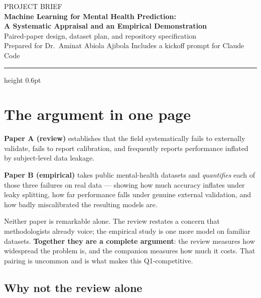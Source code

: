 \documentclass[11pt,a4paper]{article}
\begin{document}
\begin{center}
  {\sffamily\footnotesize\color{softgrey}\MakeUppercase{Project brief}}\\[0.9em]
  {\sffamily\LARGE\bfseries Machine Learning for Mental Health Prediction:\\[0.3em]
   A Systematic Appraisal and an Empirical Demonstration}\\[0.7em]
  {\sffamily\normalsize\color{softgrey} Paired-paper design, dataset plan, and
   repository specification}\\[0.9em]
  {\footnotesize\color{softgrey} Prepared for Dr.\ Aminat Abiola Ajibola \quad\textbullet\quad
   Includes a kickoff prompt for Claude Code}
\end{center}
\vspace{0.3em}
{\color{rule}\hrule height 0.6pt}
\vspace{1.2em}

\section{The argument in one page}

\begin{keybox}
\textbf{Paper A (review)} establishes that the field systematically fails to
externally validate, fails to report calibration, and frequently reports
performance inflated by subject-level data leakage.

\smallskip
\textbf{Paper B (empirical)} takes public mental-health datasets and
\emph{quantifies} each of those three failures on real data --- showing how
much accuracy inflates under leaky splitting, how far performance falls
under genuine external validation, and how badly miscalibrated the resulting
models are.

\smallskip
Neither paper is remarkable alone. The review restates a concern that
methodologists already voice; the empirical study is one more model on
familiar datasets. \textbf{Together they are a complete argument}: the review
measures how widespread the problem is, and the companion measures how much
it costs. That pairing is uncommon and is what makes this Q1-competitive.
\end{keybox}

\subsection{Why not the review alone}
\end{document}
